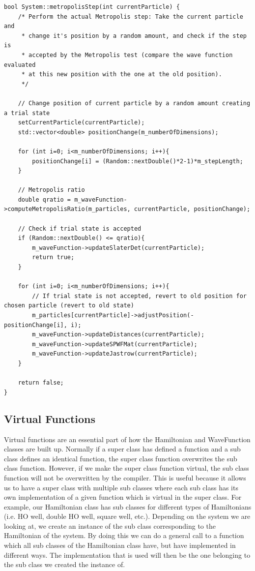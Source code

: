 \documentclass[../main.tex]{subfiles}
\begin{document}
\lstset{language=c++}
\begin{lstlisting}[caption={Metropolis Step Without Importance Sampling}]
bool System::metropolisStep(int currentParticle) {
    /* Perform the actual Metropolis step: Take the current particle and
     * change it's position by a random amount, and check if the step is
     * accepted by the Metropolis test (compare the wave function evaluated
     * at this new position with the one at the old position).
     */

    // Change position of current particle by a random amount creating a trial state
    setCurrentParticle(currentParticle);
    std::vector<double> positionChange(m_numberOfDimensions);

    for (int i=0; i<m_numberOfDimensions; i++){
        positionChange[i] = (Random::nextDouble()*2-1)*m_stepLength;
    }

    // Metropolis ratio
    double qratio = m_waveFunction->computeMetropolisRatio(m_particles, currentParticle, positionChange);

    // Check if trial state is accepted
    if (Random::nextDouble() <= qratio){
        m_waveFunction->updateSlaterDet(currentParticle);
        return true;
    }

    for (int i=0; i<m_numberOfDimensions; i++){
        // If trial state is not accepted, revert to old position for chosen particle (revert to old state)
        m_particles[currentParticle]->adjustPosition(-positionChange[i], i);
        m_waveFunction->updateDistances(currentParticle);
        m_waveFunction->updateSPWFMat(currentParticle);
        m_waveFunction->updateJastrow(currentParticle);
    }

    return false;
}
\end{lstlisting}


\subsection{Virtual Functions}

Virtual functions are an essential part of how the Hamiltonian and WaveFunction classes are built up. Normally if a super class has defined a function and a sub class defines an identical function, the super class function overwrites the sub class function. However, if we make the super class function virtual, the sub class function will not be overwritten by the compiler. This is useful because it allows us to have a super class with multiple sub classes where each sub class has its own implementation of a given function which is virtual in the super class. For example, our Hamiltonian class has sub classes for different types of Hamiltonians (i.e. HO well, double HO well, square well, etc.). Depending on the system we are looking at, we create an instance of the sub class corresponding to the Hamiltonian of the system. By doing this we can do a general call to a function which all sub classes of the Hamiltonian class have, but have implemented in different ways. The implementation that is used will then be the one belonging to the sub class we created the instance of. 
\end{document}
